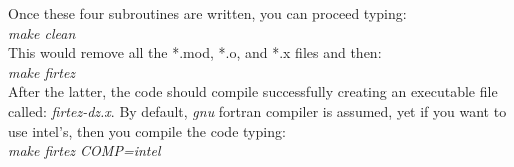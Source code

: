 Once these four subroutines are written, you can proceed typing:\\
{\it make clean}\\
This would remove all the *.mod, *.o, and *.x files and then:\\
{\it make firtez}\\
After the latter, the code should compile successfully creating an executable file called: {\it firtez-dz.x}. By default, {\it gnu} fortran compiler is assumed, yet if you want to use intel's, then you compile the code typing:\\
{\it make firtez COMP=intel}\\


%